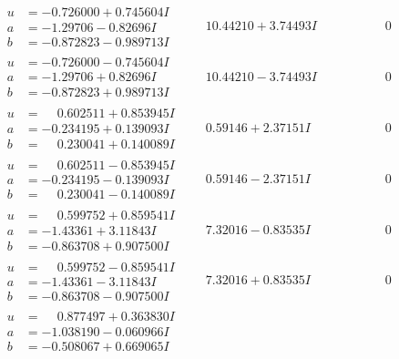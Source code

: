 \documentclass[1p]{elsarticle_modified}
\theoremstyle{definition}
\begin{document}
$$\begin{array}{c|c|c}
\begin{aligned}
u &= -0.726000 + 0.745604 I \\
a &= -1.29706 - 0.82696 I \\
b &= -0.872823 - 0.989713 I\end{aligned}
 & \phantom{-}10.44210 + 3.74493 I & \phantom{-0.000000 } 0 \\ \hline\begin{aligned}
u &= -0.726000 - 0.745604 I \\
a &= -1.29706 + 0.82696 I \\
b &= -0.872823 + 0.989713 I\end{aligned}
 & \phantom{-}10.44210 - 3.74493 I & \phantom{-0.000000 } 0 \\ \hline\begin{aligned}
u &= \phantom{-}0.602511 + 0.853945 I \\
a &= -0.234195 + 0.139093 I \\
b &= \phantom{-}0.230041 + 0.140089 I\end{aligned}
 & \phantom{-}0.59146 + 2.37151 I & \phantom{-0.000000 } 0 \\ \hline\begin{aligned}
u &= \phantom{-}0.602511 - 0.853945 I \\
a &= -0.234195 - 0.139093 I \\
b &= \phantom{-}0.230041 - 0.140089 I\end{aligned}
 & \phantom{-}0.59146 - 2.37151 I & \phantom{-0.000000 } 0 \\ \hline\begin{aligned}
u &= \phantom{-}0.599752 + 0.859541 I \\
a &= -1.43361 + 3.11843 I \\
b &= -0.863708 + 0.907500 I\end{aligned}
 & \phantom{-}7.32016 - 0.83535 I & \phantom{-0.000000 } 0 \\ \hline\begin{aligned}
u &= \phantom{-}0.599752 - 0.859541 I \\
a &= -1.43361 - 3.11843 I \\
b &= -0.863708 - 0.907500 I\end{aligned}
 & \phantom{-}7.32016 + 0.83535 I & \phantom{-0.000000 } 0 \\ \hline\begin{aligned}
u &= \phantom{-}0.877497 + 0.363830 I \\
a &= -1.038190 - 0.060966 I \\
b &= -0.508067 + 0.669065 I\end{aligned}

\end{array}$$
\end{document}

